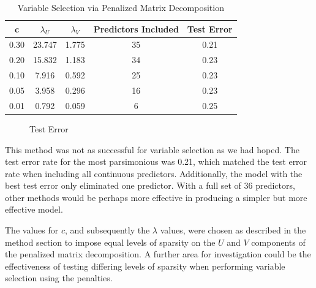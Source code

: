 \documentclass{article}
\begin{document}
\begin{table}[H]
  \caption{Variable Selection via Penalized Matrix Decomposition}
	\label{Penalized Decomp Variable Selection}
	\centering
	\begin{tabular}{ccccc}
		\toprule
					c & $\lambda_U$ & $\lambda_V$ & Predictors Included & Test Error\\
		\midrule
     0.30 &  23.747  & 1.775 &   35  &                  0.21\\
     0.20 &  15.832  & 1.183 &    34  &                  0.23\\
     0.10 &  7.916   & 0.592 &    25  &                  0.23\\
     0.05 &  3.958   & 0.296 &    16  &                  0.23\\
     0.01 &  0.792   & 0.059 &    \phantom{0}6   &                  0.25\\
		\bottomrule
	\end{tabular}
\end{table}

\begin{figure}[!htp]
  \centering
  \caption{Test Error \label{fig:2}}
\end{figure}
This method was not as successful for variable selection as we had hoped.  The test error rate for the most parsimonious was 0.21, which matched the test error rate when including all continuous predictors.  Additionally, the model with the best test error only eliminated one predictor.  With a full set of 36 predictors, other methods would be perhaps more effective in producing a simpler but more effective model.

The values for $c$, and subsequently the $\lambda$ values, were chosen as described in the method section to impose equal levels of sparsity on the $U$ and $V$ components of the penalized matrix decomposition.  A further area for investigation could be the effectiveness of testing differing levels of sparsity when performing variable selection using the penalties.
\end{document}
